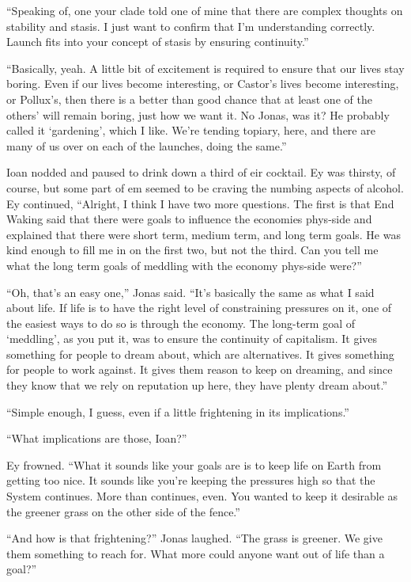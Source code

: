 ``Speaking of, one your clade told one of mine that there are complex thoughts on stability and stasis. I just want to confirm that I'm understanding correctly. Launch fits into your concept of stasis by ensuring continuity.''

``Basically, yeah. A little bit of excitement is required to ensure that our lives stay boring. Even if our lives become interesting, or Castor's lives become interesting, or Pollux's, then there is a better than good chance that at least one of the others' will remain boring, just how we want it. No Jonas, was it? He probably called it `gardening', which I like. We're tending topiary, here, and there are many of us over on each of the launches, doing the same.''

Ioan nodded and paused to drink down a third of eir cocktail. Ey was thirsty, of course, but some part of em seemed to be craving the numbing aspects of alcohol. Ey continued, ``Alright, I think I have two more questions. The first is that End Waking said that there were goals to influence the economies phys-side and explained that there were short term, medium term, and long term goals. He was kind enough to fill me in on the first two, but not the third. Can you tell me what the long term goals of meddling with the economy phys-side were?''

``Oh, that's an easy one,'' Jonas said. ``It's basically the same as what I said about life. If life is to have the right level of constraining pressures on it, one of the easiest ways to do so is through the economy. The long-term goal of `meddling', as you put it, was to ensure the continuity of capitalism. It gives something for people to dream about, which are alternatives. It gives something for people to work against. It gives them reason to keep on dreaming, and since they know that we rely on reputation up here, they have plenty dream about.''

``Simple enough, I guess, even if a little frightening in its implications.''

``What implications are those, Ioan?''

Ey frowned. ``What it sounds like your goals are is to keep life on Earth from getting too nice. It sounds like you're keeping the pressures high so that the System continues. More than continues, even. You wanted to keep it desirable as the greener grass on the other side of the fence.''

``And how is that frightening?'' Jonas laughed. ``The grass is greener. We give them something to reach for. What more could anyone want out of life than a goal?''

